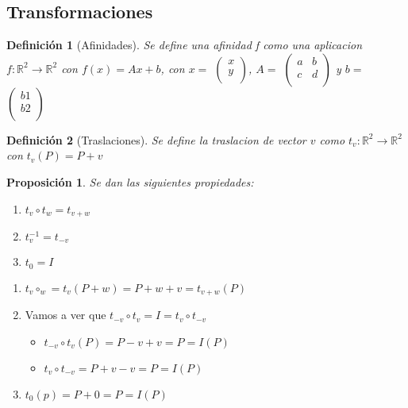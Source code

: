 \documentclass[11pt, a4paper, titlepage]{article}
\makeatletter
\renewenvironment{proof}[1][\proofname] {\vspace{-15pt}\par\pushQED{\qed}\normalfont\topsep6\p@\@plus6\p@\relax\trivlist\item[\hskip\labelsep\it#1\@addpunct{.}]\ignorespaces}{\popQED\endtrivlist\@endpefalse}
\newcommand{\R}{\mathbb{R}}
\theoremstyle{theorem-style}
\newtheorem*{nprop}{Proposición}
\theoremstyle{definition-style}
\newtheorem*{ndef}{Definición}
\theoremstyle{remark-style}
\theoremstyle{example-style}
\newenvironment{nlist}
{\begin{enumerate}
    \renewcommand\labelenumi{(\emph{\roman{enumi})}}}
  {\end{enumerate}}
\makeatother
\begin{document}
\subsection{Transformaciones}

\begin{ndef}[Afinidades]
  Se define una afinidad f como una aplicacion $f:\R^2 \rightarrow \R^2$ con $f(x) = Ax + b$, con $x =$ $\begin{pmatrix}
    x\\
    y\\
  \end{pmatrix}$, $A =$ $\begin{pmatrix}
    a & b\\
    c & d\\
  \end{pmatrix}$
  y $b =$ $\begin{pmatrix}
    b1\\
    b2\\
  \end{pmatrix}$


\end{ndef}

\begin{ndef}[Traslaciones]
  Se define la traslacion de vector $v$ como $t_v: \R^2 \rightarrow \R^2$ con $t_v(P) = P + v$
\end{ndef}

\begin{nprop}
  Se dan las siguientes propiedades:
  \begin{nlist}
  \item $t_v \circ t_w = t_{v+w}$
  \item $t_{v}^{-1} = t_{-v}$
  \item $t_0 = I$
  \end{nlist}
\end{nprop}
\begin{proof}\hfill \begin{center}\end{center}
  \begin{nlist}
  \item $t_v \circ_w = t_v(P+w) = P+w+v = t_{v+w}(P)$
  \item Vamos a ver que $t_{-v}\circ t_v = I = t_v \circ t_{-v}$
    \begin{itemize}
    \item $t_{-v}\circ t_v (P) = P-v+v = P = I(P)$
    \item $t_v\circ t_{-v} = P+v-v = P = I(P)$
    \end{itemize}
  \item $t_0(p) = P +0 = P = I(P)$
  \end{nlist}
\end{proof}
\end{document}
